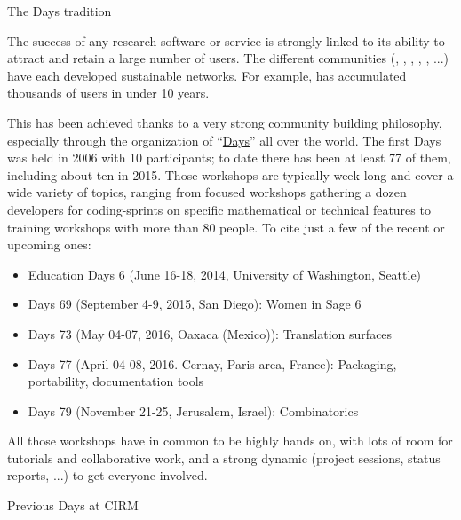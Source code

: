 \documentclass[12pt]{amsart}
\makeatletter
\def\subsection{\@startsection{subsection}{2}%
  \z@{.3\linespacing\@plus.5\linespacing}{.1\linespacing}%
  {\normalfont\bfseries}}
\makeatother
\begin{document}

\subsection{The \Sage Days tradition}

The success of any research software or service is strongly linked to
its ability to attract and retain a large number of users. The
different communities (\Sage, \GAP, \Pari, \Singular, \Jupyter, ...)
have each developed sustainable networks. For example, \Sage has
accumulated thousands of users in under 10 years.

This has been achieved thanks to a very strong community building
philosophy, especially through the organization of
“\href{https://wiki.sagemath.org/Workshops}{\Sage Days}” all over the
world. The first \Sage Days was held in 2006 with 10 participants; to
date there has been at least 77 of them, including about ten in
2015. Those workshops are typically week-long and cover a wide
variety of topics, ranging from focused workshops gathering a dozen
developers for coding-sprints on specific mathematical or technical
features to training workshops with more than 80 people. To cite just
a few of the recent or upcoming ones:

\begin{itemize}
\item \Sage Education Days 6 (June 16-18, 2014, University of
  Washington, Seattle)
\item \Sage Days 69 (September 4-9, 2015, San Diego): Women in Sage 6
\item \Sage Days 73 (May 04-07, 2016, Oaxaca (Mexico)): Translation surfaces
\item \Sage Days 77 (April 04-08, 2016. Cernay, Paris area, France):
  Packaging, portability, documentation tools
\item \Sage Days 79 (November 21-25, Jerusalem, Israel): Combinatorics
\end{itemize}

All those workshops have in common to be highly hands on, with lots of
room for tutorials and collaborative work, and a strong dynamic
(project sessions, status reports, ...) to get everyone involved.

\subsection{Previous \Sage Days at CIRM}
\end{document}
